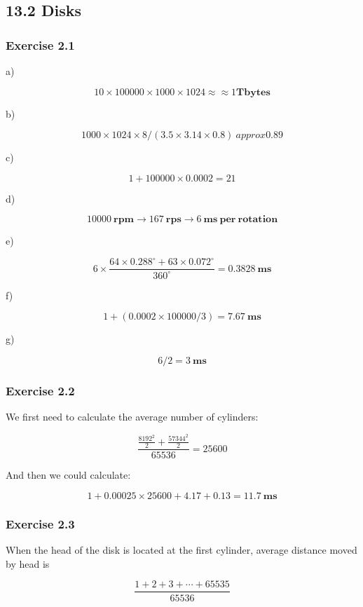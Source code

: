 \documentclass[../../main.tex]{subfiles}
\begin{document}
\hypertarget{Section13.2}{\subsection*{13.2 Disks}}

\subsubsection*{Exercise 2.1}

a)

$$
10 \times 100000 \times 1000 \times 1024 \approx≈ 1 \mathbf{Tbytes}
$$

b)

$$
1000 \times 1024 \times 8 / (3.5 \times 3.14 \times 0.8)\ approx 0.89
$$

c)

$$
1 + 100000 \times 0.0002 = 21
$$

d)

$$
10000 \ \mathbf{rpm} \to 167 \ \mathbf{rps} \to 6 \ \mathbf{ms \ per \ rotation}
$$

e)

$$
6 \times \frac{64 \times 0.288^{\circ}  + 63 \times 0.072^{\circ}}{360^{\circ}} = 0.3828 \ \mathbf{ms}
$$

f)

$$
1 + (0.0002 \times 100000 / 3)=7.67 \ \mathbf{ms}
$$

g)

$$
6 / 2 = 3 \ \mathbf{ms}
$$

\subsubsection*{Exercise 2.2}

We first need to calculate the average number of cylinders:

$$
\frac{\frac{8192^2}{2} + \frac{57344^2}{2}}{65536} = 25600
$$

And then we could calculate:

$$
1 + 0.00025 \times 25600 + 4.17 + 0.13 = 11.7 \ \mathbf{ms}
$$

\subsubsection*{Exercise 2.3}

When the head of the disk is located at the first cylinder, average
distance moved by head is

$$
\frac{1 + 2 + 3  + \cdots + 65535}{65536}
$$
\end{document}
